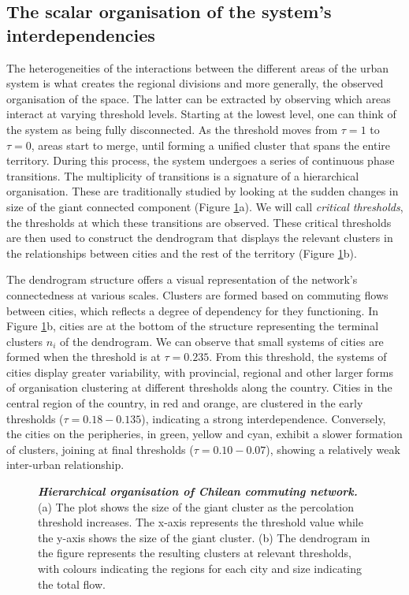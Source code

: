 \documentclass[11pt, a4paper]{article}
\begin{document}
\subsection{The scalar organisation of the system's interdependencies}

The heterogeneities of the interactions between the different areas of the urban system is what creates the regional divisions and more generally, the observed organisation of the space. The latter can be extracted by observing which areas interact at varying threshold levels. Starting at the lowest level, one can think of the system as being fully disconnected. As the threshold moves from $\tau=1$ to $\tau=0$, areas start to merge, until forming a unified cluster that spans the entire territory. During this process, the system undergoes a series of continuous phase transitions. The multiplicity of transitions is a signature of a hierarchical organisation. These are traditionally studied by looking at the sudden changes in size of the giant connected component (Figure \ref{perco}a). We will call \emph{critical thresholds}, the thresholds at which these transitions are observed. These critical thresholds are then used to construct the dendrogram that displays the relevant clusters in the relationships between cities and the rest of the territory (Figure \ref{perco}b). 

The dendrogram structure offers a visual representation of the network's connectedness at various scales. Clusters are formed based on commuting flows between cities, which reflects a degree of dependency for they functioning. In Figure \ref{perco}b, cities are at the bottom of the structure representing the terminal clusters $n_i$ of the dendrogram. We can observe that small systems of cities are formed when the threshold is at $\tau = 0.235$. From this threshold, the systems of cities display greater variability, with provincial, regional and other larger forms of organisation clustering at different thresholds along the country. Cities in the central region of the country, in red and orange, are clustered in the early thresholds ($\tau = 0.18 - 0.135$), indicating a strong interdependence. Conversely, the cities on the peripheries, in green, yellow and cyan, exhibit a slower formation of clusters, joining at final thresholds ($\tau = 0.10 - 0.07$), showing a relatively weak inter-urban relationship.

\begin{figure}[h!]
\centering
{}
\caption{\textit{\textbf{Hierarchical organisation of Chilean commuting network.} } (a) The plot shows the size of the giant cluster as the percolation threshold increases. The x-axis represents the threshold value while the y-axis shows the size of the giant cluster. (b) The dendrogram in the figure represents the resulting clusters at relevant thresholds, with colours indicating the regions for each city and size indicating the total flow.}
\label{perco}
\end{figure}
\end{document}
